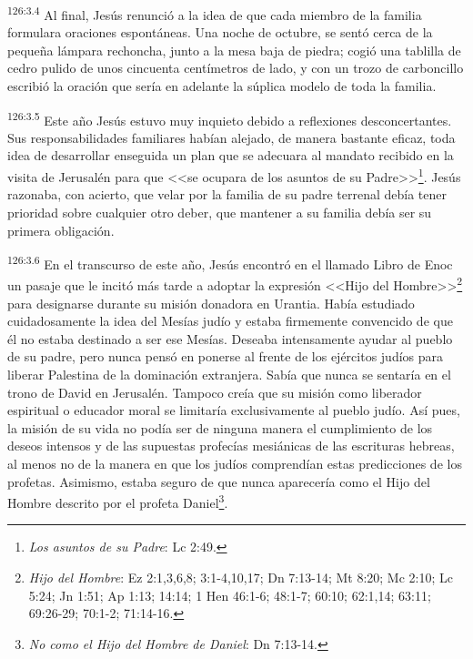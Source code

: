 \par 
\textsuperscript{126:3.4} Al final, Jesús renunció a la idea de que cada miembro de la familia formulara oraciones espontáneas. Una noche de octubre, se sentó cerca de la pequeña lámpara rechoncha, junto a la mesa baja de piedra; cogió una tablilla de cedro pulido de unos cincuenta centímetros de lado, y con un trozo de carboncillo escribió la oración que sería en adelante la súplica modelo de toda la familia.

\par 
\textsuperscript{126:3.5} Este año Jesús estuvo muy inquieto debido a reflexiones desconcertantes. Sus responsabilidades familiares habían alejado, de manera bastante eficaz, toda idea de desarrollar enseguida un plan que se adecuara al mandato recibido en la visita de Jerusalén para que <<se ocupara de los asuntos de su Padre>>\footnote{\textit{Los asuntos de su Padre}: Lc 2:49.}. Jesús razonaba, con acierto, que velar por la familia de su padre terrenal debía tener prioridad sobre cualquier otro deber, que mantener a su familia debía ser su primera obligación.

\par 
\textsuperscript{126:3.6} En el transcurso de este año, Jesús encontró en el llamado Libro de Enoc un pasaje que le incitó más tarde a adoptar la expresión <<Hijo del Hombre>>\footnote{\textit{Hijo del Hombre}: Ez 2:1,3,6,8; 3:1-4,10,17; Dn 7:13-14; Mt 8:20; Mc 2:10; Lc 5:24; Jn 1:51; Ap 1:13; 14:14; 1 Hen 46:1-6; 48:1-7; 60:10; 62:1,14; 63:11; 69:26-29; 70:1-2; 71:14-16.} para designarse durante su misión donadora en Urantia. Había estudiado cuidadosamente la idea del Mesías judío y estaba firmemente convencido de que él no estaba destinado a ser ese Mesías. Deseaba intensamente ayudar al pueblo de su padre, pero nunca pensó en ponerse al frente de los ejércitos judíos para liberar Palestina de la dominación extranjera. Sabía que nunca se sentaría en el trono de David en Jerusalén. Tampoco creía que su misión como liberador espiritual o educador moral se limitaría exclusivamente al pueblo judío. Así pues, la misión de su vida no podía ser de ninguna manera el cumplimiento de los deseos intensos y de las supuestas profecías mesiánicas de las escrituras hebreas, al menos no de la manera en que los judíos comprendían estas predicciones de los profetas. Asimismo, estaba seguro de que nunca aparecería como el Hijo del Hombre descrito por el profeta Daniel\footnote{\textit{No como el Hijo del Hombre de Daniel}: Dn 7:13-14.}.


